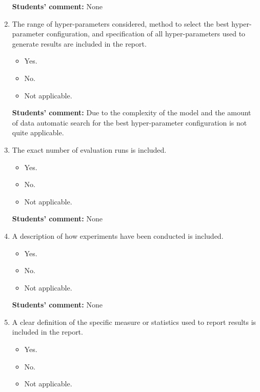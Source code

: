 \documentclass{article}
\begin{document}
\begin{enumerate}
    \textbf{Students' comment:} None
    
    \item The range of hyper-parameters considered, method to select the best hyper-parameter
configuration, and specification of all hyper-parameters used to generate results are included in the report.
    \begin{itemize}
        \item [\faCheckSquareO] Yes.
        \item [\faSquareO] No.
        \item [\faSquareO] Not applicable.
    \end{itemize}
    
    \textbf{Students' comment:} Due to the complexity of the model and the 
    amount of data automatic search for the best hyper-parameter configuration 
    is not quite applicable.
    
    \item The exact number of evaluation runs is included.
    \begin{itemize}
        \item [\faSquareO] Yes.
        \item [\faSquareO] No.
        \item [\faCheckSquareO] Not applicable.
    \end{itemize}
    
    \textbf{Students' comment:} None
    
    \item A description of how experiments have been conducted is included.
    \begin{itemize}
        \item [\faSquareO] Yes.
        \item [\faSquareO] No.
        \item [\faSquareO] Not applicable.
    \end{itemize}
    
    \textbf{Students' comment:} None
    
    \item A clear definition of the specific measure or statistics used to report results is included in the report.
    \begin{itemize}
        \item [\faSquareO] Yes.
        \item [\faSquareO] No.
        \item [\faSquareO] Not applicable.
    \end{itemize}
    

\end{enumerate}
\end{document}
